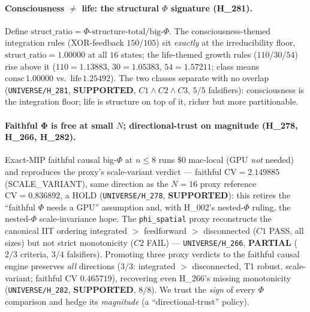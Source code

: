 \paragraph{Consciousness $\ne$ life: the structural $\Phi$ signature (H\_281).}
Define $\mathrm{struct\_ratio}=\Phi\text{-structure-total}/\text{big-}\Phi$. The
consciousness-themed integration rules (XOR-feedback $150$/$105$) sit \emph{exactly}
at the irreducibility floor, $\mathrm{struct\_ratio}=1.00000$ at all $16$ states;
the life-themed growth rules ($110$/$30$/$54$) rise above it
($110{=}1.13883$, $30{=}1.05383$, $54{=}1.57211$; class means
$\text{consc}\,1.00000$ vs.\ $\text{life}\,1.25492$). The two classes separate with
no overlap (\texttt{UNIVERSE/H\_281}, \textbf{SUPPORTED}, $C1\wedge C2\wedge C3$,
$5/5$ falsifiers): consciousness is the integration floor; life is structure on top
of it, richer but more partitionable.

\paragraph{Faithful Φ is free at small $N$; directional-trust on magnitude (H\_278,
H\_266, H\_282).} Exact-MIP faithful causal big-$\Phi$ at $n{\le}8$ runs $\$0$
mac-local (GPU \emph{not} needed) and reproduces the proxy's scale-variant verdict ---
faithful $\mathrm{CV}=2.149885$ (SCALE\_VARIANT), same direction as the $N{=}16$ proxy
reference $\mathrm{CV}=0.836892$, a HOLD (\texttt{UNIVERSE/H\_278}, \textbf{SUPPORTED}):
this retires the ``faithful $\Phi$ needs a GPU'' assumption and, with H\_002's
nested-$\Phi$ ruling, the nested-$\Phi$ scale-invariance hope. The \texttt{phi\_spatial}
proxy reconstructs the canonical IIT ordering integrated $>$ feedforward $>$ disconnected
($C1$ PASS, all sizes) but not strict monotonicity ($C2$ FAIL) ---
\texttt{UNIVERSE/H\_266}, \textbf{PARTIAL} ($2/3$ criteria, $3/4$ falsifiers). Promoting
three proxy verdicts to the faithful causal engine preserves \emph{all} directions
($3/3$: integrated $>$ disconnected, T1 robust, scale-variant; faithful CV $0.465719$),
recovering even H\_266's missing monotonicity (\texttt{UNIVERSE/H\_282}, \textbf{SUPPORTED},
$8/8$). We trust the \emph{sign} of every $\Phi$ comparison and hedge its \emph{magnitude}
(a ``directional-trust'' policy).

